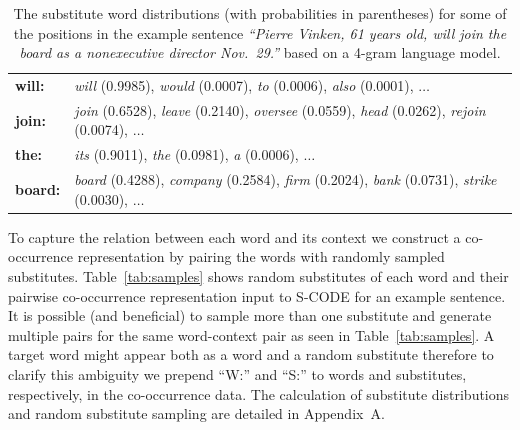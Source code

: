 \begin{table}[h]
\caption{The substitute word distributions (with probabilities in
  parentheses) for some of the positions in the example sentence
  \textit{``Pierre Vinken, 61 years old, will join the board as a
    nonexecutive director Nov.~29.''} based on a 4-gram language
  model.}
\label{tab:subdist}
\begin{tabular}{|ll|} \hline
\textbf{will:} & \textit{will} (0.9985), \textit{would} (0.0007), \textit{to} (0.0006), \textit{also} (0.0001), $\ldots$ \\
\textbf{join:} & \textit{join} (0.6528), \textit{leave} (0.2140), \textit{oversee} (0.0559), \textit{head} (0.0262), \textit{rejoin} (0.0074), $\ldots$ \\
\textbf{the:}  &\textit{its} (0.9011), \textit{the} (0.0981), \textit{a} (0.0006), $\ldots$ \\
\textbf{board:} & \textit{board} (0.4288), \textit{company} (0.2584), \textit{firm} (0.2024), \textit{bank} (0.0731), \textit{strike} (0.0030), $\ldots$ \\
\hline
\end{tabular}
\end{table}

To capture the relation between each word and its context we construct
a co-occurrence representation by pairing the words with randomly
sampled substitutes.  Table~\ref{tab:samples} shows random substitutes
of each word and their pairwise co-occurrence representation input to
S-CODE for an example sentence.  It is possible (and beneficial) to
sample more than one substitute and generate multiple pairs for the
same word-context pair as seen in Table~\ref{tab:samples}.  A target
word might appear both as a word and a random substitute therefore to
clarify this ambiguity we prepend ``W:'' and ``S:'' to words and
substitutes, respectively, in the co-occurrence data.  The calculation
of substitute distributions and random substitute sampling are
detailed in Appendix~A.


